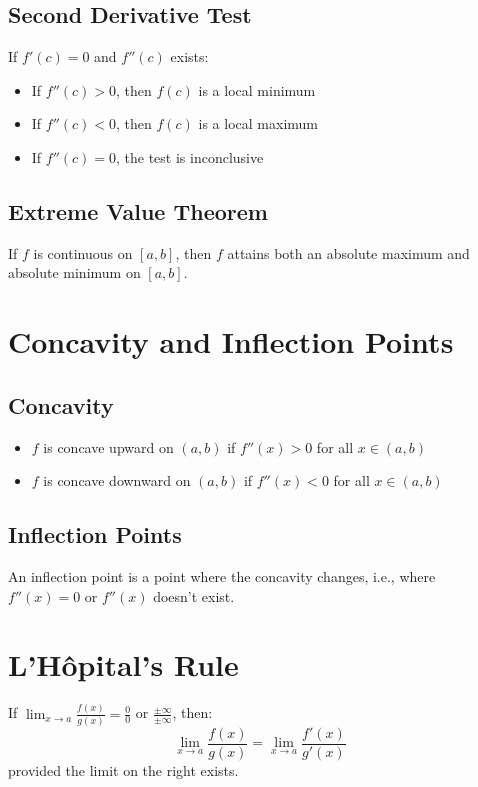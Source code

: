 \documentclass[11pt]{article}
\begin{document}
\subsection{Second Derivative Test}
If $f'(c) = 0$ and $f''(c)$ exists:
\begin{itemize}
    \item If $f''(c) > 0$, then $f(c)$ is a local minimum
    \item If $f''(c) < 0$, then $f(c)$ is a local maximum
    \item If $f''(c) = 0$, the test is inconclusive
\end{itemize}

\subsection{Extreme Value Theorem}
If $f$ is continuous on $[a,b]$, then $f$ attains both an absolute maximum and absolute minimum on $[a,b]$.

\section{Concavity and Inflection Points}

\subsection{Concavity}
\begin{itemize}
    \item $f$ is concave upward on $(a,b)$ if $f''(x) > 0$ for all $x \in (a,b)$
    \item $f$ is concave downward on $(a,b)$ if $f''(x) < 0$ for all $x \in (a,b)$
\end{itemize}

\subsection{Inflection Points}
An inflection point is a point where the concavity changes, i.e., where $f''(x) = 0$ or $f''(x)$ doesn't exist.

\section{L'Hôpital's Rule}

If $\lim_{x \to a} \frac{f(x)}{g(x)} = \frac{0}{0}$ or $\frac{\pm\infty}{\pm\infty}$, then:
$$\lim_{x \to a} \frac{f(x)}{g(x)} = \lim_{x \to a} \frac{f'(x)}{g'(x)}$$
provided the limit on the right exists.
\end{document}
